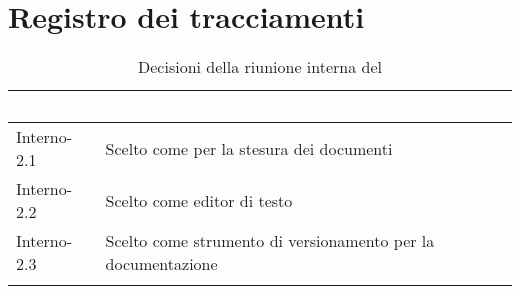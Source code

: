 \section{Registro dei tracciamenti}
{

\renewcommand{\arraystretch}{1.5}
\centering
\begin{longtable}{C{3cm} C{9cm}}
\textcolor{white}{\textbf{Codice}}&
\textcolor{white}{\textbf{Decisione}}\\	
\endhead
		
Interno-2.1 & Scelto  come  per la stesura dei documenti\\

Interno-2.2 & Scelto  come editor di testo\\

Interno-2.3 & Scelto  come strumento di versionamento per la documentazione\\
		
\caption{Decisioni della riunione interna del \Data{}}
\end{longtable}
}
